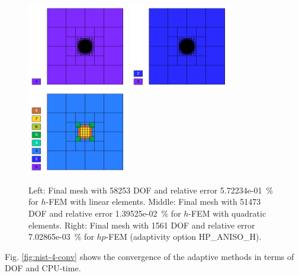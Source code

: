 \documentclass[12pt]{elsarticle}
\begin{document}
\begin{figure}[H]
\centering
\includegraphics[height=3.7cm]{nist/nist-4/mesh_h1_aniso.png}
\includegraphics[height=3.7cm]{nist/nist-4/mesh_h2_aniso.png}
\includegraphics[height=3.7cm]{nist/nist-4/mesh_hp_aniso.png}
\caption{
Left: Final mesh with 58253 DOF and relative error 5.72234e-01~\% for $h$-FEM with linear elements.
Middle: Final mesh with 51473 DOF and relative error 1.39525e-02~\% for $h$-FEM with quadratic elements. 
Right: Final mesh with 1561 DOF and relative error 7.02865e-03~\% for $hp$-FEM (adaptivity option HP\_ANISO\_H).}
\label{fig:nist-4-hp-aniso}
\end{figure}

Fig. \ref{fig:nist-4-conv} shows the convergence of the adaptive methods in terms of DOF and CPU-time.
\end{document}
